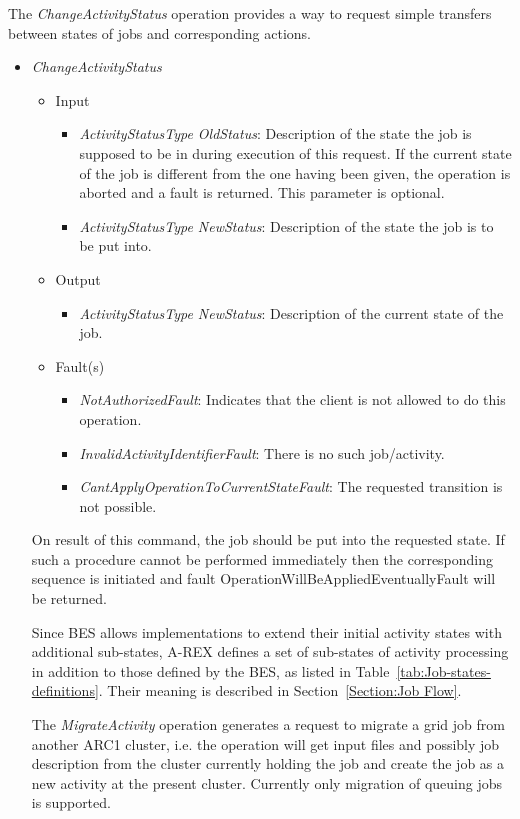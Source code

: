 \documentclass{article}                            %
\begin{document}
The \emph{ChangeActivityStatus} operation provides a way to request 
simple transfers between states of jobs and corresponding
actions.

\begin{itemize}
\item \emph{ChangeActivityStatus}
\begin{itemize}
\item Input
\begin{itemize}
\item \emph{ActivityStatusType OldStatus}: Description of the state the
job is supposed to be in during execution of this request. If the
current state of the job is different from the one having been given,
the operation is aborted and a fault is returned. This parameter is
optional.
\item \emph{ActivityStatusType NewStatus}: Description of the state the
job is to be put into.
\end{itemize}
\item Output
\begin{itemize}
\item \emph{ActivityStatusType NewStatus}: Description of the current state
of the job.
\end{itemize}
\item Fault(s)
\begin{itemize}
\item \emph{NotAuthorizedFault}: Indicates that the client is not allowed
to do this operation.
\item \emph{InvalidActivityIdentifierFault}: There is no such job/activity.
\item \emph{CantApplyOperationToCurrentStateFault}: The requested transition
is not possible.
\end{itemize}
\end{itemize}

On result of this command, the job should be put into the requested
state. If such a procedure cannot be performed immediately then the
corresponding sequence is initiated and fault 
OperationWillBeAppliedEventuallyFault will be returned.

Since BES allows implementations to extend their initial activity
states with additional sub-states, A-REX defines a set of sub-states
of activity processing in addition to those defined by the BES, as
listed in Table~\ref{tab:Job-states-definitions}. Their meaning is
described in Section~\ref{Section:Job Flow}.

The \emph{MigrateActivity} operation generates a request to migrate a 
grid job from another ARC1 cluster, i.e. the operation will get input 
files and possibly job description from the cluster currently holding 
the job and create the job as a new activity at the present cluster.
Currently only migration of queuing jobs is supported. 


\end{itemize}
\end{document}
